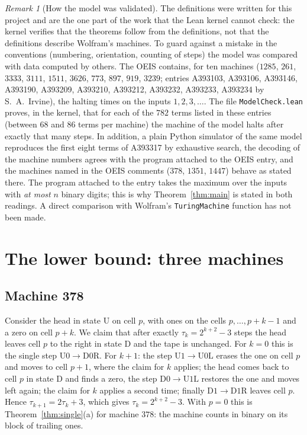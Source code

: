 \documentclass[11pt,a4paper]{amsart}
\theoremstyle{definition}
\theoremstyle{remark}
\newtheorem{remark}[theorem]{Remark}
\newcommand{\U}{\mathrm{U}}
\newcommand{\D}{\mathrm{D}}
\newcommand{\lean}[1]{\texttt{#1}}
\begin{document}
\begin{remark}[How the model was validated]\label{rem:validation}
The definitions were written for this project and are the one part of the work that the Lean kernel cannot
check: the kernel verifies that the theorems follow from the definitions, not that the definitions describe
Wolfram's machines. To guard against a mistake in the conventions (numbering, orientation, counting of
steps) the model was compared with data computed by others. The OEIS contains, for ten machines
($1285$, $261$, $3333$, $3111$, $1511$, $3626$, $773$, $897$, $919$, $3239$; entries A393103, A393106,
A393146, A393190, A393209, A393210, A393212, A393232, A393233, A393234 by S.~A.~Irvine), the halting times on
the inputs $1,2,3,\dots$. The file \lean{ModelCheck.lean} proves, in the kernel, that for each of the $782$
terms listed in these entries (between $68$ and $86$ terms per machine) the machine of the model halts after
exactly that many steps. In addition, a
plain Python simulator of the same model reproduces the first eight terms of A393317 by exhaustive search, the
decoding of the machine numbers agrees with the program attached to the OEIS entry, and the machines named in
the OEIS comments ($378$, $1351$, $1447$) behave as stated there. The program attached to the entry takes the
maximum over the inputs with \emph{at most} $n$ binary digits; this is why Theorem~\ref{thm:main} is stated
in both readings. A direct comparison with Wolfram's \texttt{TuringMachine} function has not been made.
\end{remark}

\section{The lower bound: three machines}\label{sec:lower}

\subsection*{Machine 378}
Consider the head in state $\U$ on cell $p$, with ones on the cells $p,\dots,p+k-1$ and a zero on cell $p+k$.
We claim that after exactly $\tau_k=2^{k+2}-3$ steps the head leaves cell $p$ to the right in state $\D$ and
the tape is unchanged. For $k=0$ this is the single step $\U0\to\D0\mathrm{R}$. For $k+1$: the step
$\U1\to\U0\mathrm{L}$ erases the one on cell $p$ and moves to cell $p+1$, where the claim for $k$ applies; the
head comes back to cell $p$ in state $\D$ and finds a zero, the step $\D0\to\U1\mathrm{L}$ restores the one
and moves left again; the claim for $k$ applies a second time; finally $\D1\to\D1\mathrm{R}$ leaves cell $p$.
Hence $\tau_{k+1}=2\tau_k+3$, which gives $\tau_k=2^{k+2}-3$. With $p=0$ this is
Theorem~\ref{thm:single}(a) for machine $378$: the machine counts in binary on its block of trailing ones.
\end{document}
